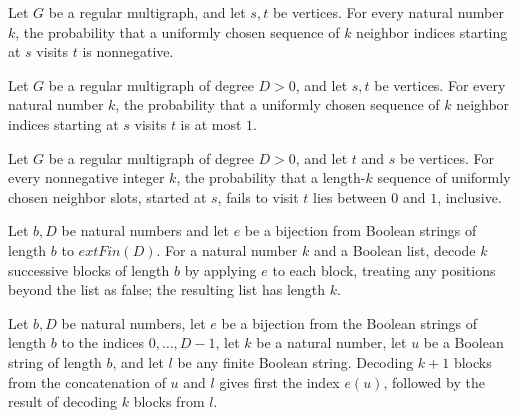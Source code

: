\begin{theorem}
\label{Randomized.RegularMultigraph.hitProb_nonneg}
\leanok
{}
Let $G$ be a regular multigraph, and let $s,t$ be vertices. For every natural number
$k$, the probability that a uniformly chosen sequence of $k$ neighbor indices starting
at $s$ visits $t$ is nonnegative.
\end{theorem}

\begin{theorem}
\label{Randomized.RegularMultigraph.hitProb_le_one}
\leanok
{}
Let $G$ be a regular multigraph of degree $D>0$, and let $s,t$ be vertices. For every
natural number $k$, the probability that a uniformly chosen sequence of $k$ neighbor
indices starting at $s$ visits $t$ is at most $1$.
\end{theorem}

\begin{theorem}
\label{Randomized.RegularMultigraph.missProb_mem_Icc}
\leanok
{}
Let $G$ be a regular multigraph of degree $D>0$, and let $t$ and $s$ be vertices. For
every nonnegative integer $k$, the probability that a length-$k$ sequence of uniformly
chosen neighbor slots, started at $s$, fails to visit $t$ lies between $0$ and $1$,
inclusive.
\end{theorem}

\begin{definition}
\label{Randomized.decodeIdx}
\leanok
Let $b,D$ be natural numbers and let $e$ be a bijection from Boolean strings of length
$b$ to $	ext{Fin}(D)$. For a natural number $k$ and a Boolean list, decode $k$
successive blocks of length $b$ by applying $e$ to each block, treating any positions
beyond the list as false; the resulting list has length $k$.
\end{definition}

\begin{theorem}
\label{Randomized.decodeIdx_succ_append}
\leanok
{}
Let $b,D$ be natural numbers, let $e$ be a bijection from the Boolean strings of length
$b$ to the indices $0,\ldots,D-1$, let $k$ be a natural number, let $u$ be a Boolean
string of length $b$, and let $l$ be any finite Boolean string. Decoding $k+1$ blocks
from the concatenation of $u$ and $l$ gives first the index $e(u)$, followed by the
result of decoding $k$ blocks from $l$.
\end{theorem}

